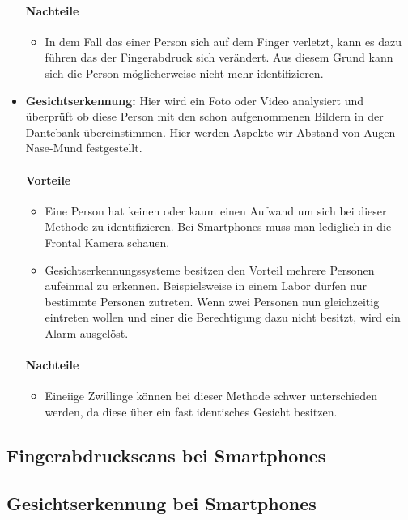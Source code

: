 \begin{itemize}
	\paragraph{Nachteile}
	\begin{itemize}
		\item In dem Fall das einer Person sich auf dem Finger verletzt, kann es dazu führen das der Fingerabdruck sich verändert. Aus diesem Grund kann sich die Person möglicherweise nicht mehr identifizieren.
	\end{itemize}
	\item \textbf{Gesichtserkennung:} Hier wird ein Foto oder Video analysiert und überprüft ob diese Person mit den schon aufgenommenen Bildern in der Dantebank übereinstimmen. Hier werden Aspekte wir Abstand von Augen-Nase-Mund festgestellt.
	\paragraph{Vorteile}
	\begin{itemize}
		\item Eine Person hat keinen oder kaum einen Aufwand um sich bei dieser Methode zu identifizieren. Bei Smartphones muss man lediglich in die Frontal Kamera schauen.
		\item Gesichtserkennungssysteme besitzen den Vorteil mehrere Personen aufeinmal zu erkennen. Beispielsweise in einem Labor dürfen nur bestimmte Personen zutreten. Wenn zwei Personen nun gleichzeitig eintreten wollen und einer die Berechtigung dazu nicht besitzt, wird ein Alarm ausgelöst.
	\end{itemize}
	\paragraph{Nachteile}
	\begin{itemize}
		\item Eineiige Zwillinge können bei dieser Methode schwer unterschieden werden, da diese über ein fast identisches Gesicht besitzen.
	\end{itemize}
\end{itemize}

\subsection{Fingerabdruckscans bei Smartphones}


\subsection{Gesichtserkennung bei Smartphones}


